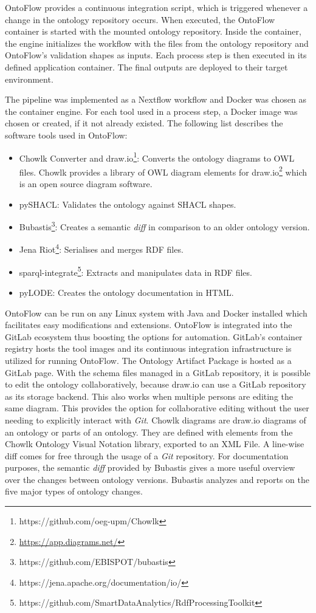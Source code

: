 \documentclass[runningheads]{llncs}
\begin{document}
OntoFlow provides a continuous integration script, which is triggered whenever a change in the ontology repository occurs. When executed, the OntoFlow container is started with the mounted ontology repository. Inside the container, the engine initializes the workflow with the files from the ontology repository and OntoFlow's validation shapes as inputs. Each process step is then executed in its defined application container. The final outputs are deployed to their target environment.

The pipeline was implemented as a Nextflow \cite{Tommaso} workflow and Docker was chosen as the container engine. For each tool used in a process step, a Docker image was chosen or created, if it not already existed. The following list describes the software tools used in OntoFlow:

\begin{itemize}
  \item Chowlk Converter and draw.io\footnote{https://github.com/oeg-upm/Chowlk}: Converts the ontology diagrams to OWL files. Chowlk\cite{ChavezFeria} provides a library of OWL diagram elements for draw.io\footnote{\url{https://app.diagrams.net/}} which is an open source diagram software. 
  \item pySHACL: Validates the ontology against SHACL shapes.
  \item Bubastis\footnote{https://github.com/EBISPOT/bubastis}: Creates a semantic \textit{diff} in comparison to an older ontology version.
  \item Jena Riot\footnote{https://jena.apache.org/documentation/io/}: Serialises and merges RDF files.
  \item sparql-integrate\footnote{https://github.com/SmartDataAnalytics/RdfProcessingToolkit}: Extracts and manipulates data in RDF files.
  \item pyLODE: Creates the ontology documentation in HTML.
\end{itemize}
OntoFlow can be run on any Linux system with Java and Docker installed which facilitates easy modifications and extensions. OntoFlow is integrated into the GitLab ecosystem thus boosting the options for automation. GitLab's container registry hosts the tool images and its continuous integration infrastructure is utilized for running OntoFlow. The Ontology Artifact Package is hosted as a GitLab page. With the schema files managed in a GitLab repository, it is possible to edit the ontology collaboratively, because draw.io can use a GitLab repository as its storage backend. This also works when multiple persons are editing the same diagram. This provides the option for collaborative editing without the user needing to explicitly interact with \textit{Git}. Chowlk diagrams are draw.io diagrams of an ontology or parts of an ontology. They are defined with elements from the Chowlk Ontology Visual Notation library, exported to an XML File. A line-wise diff comes for free through the usage of a \textit{Git} repository. For documentation purposes, the semantic \textit{diff} provided by Bubastis\cite{malone} gives a more useful overview over the changes between ontology versions. Bubastis analyzes and reports on the five major types of ontology changes.
\end{document}
